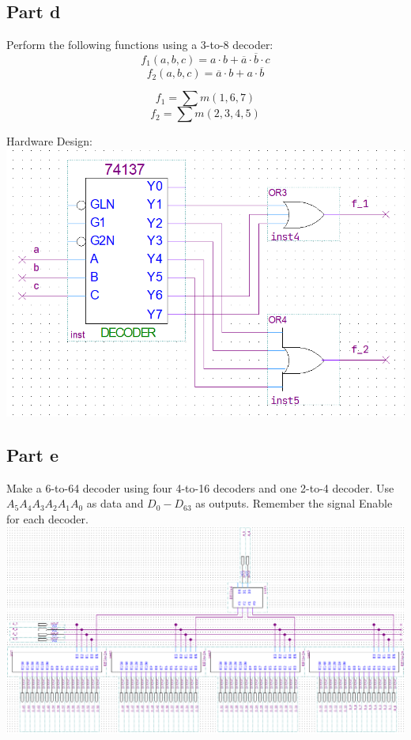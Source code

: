 \documentclass[12pt, a4paper]{article}
\begin{document}
	\subsection*{Part d}
	Perform the following functions using a 3-to-8 decoder:
	\begin{equation}
	f_1(a, b, c) = a \cdot b + \overline{a} \cdot \overline{b} \cdot {c}
	\end{equation}
	\begin{equation}
	f_2(a, b, c) = \overline{a} \cdot {b} + a \cdot \overline{b}
	\end{equation}
	
	$$f_1 = \sum{m(1, 6, 7)}$$
	$$f_2 = \sum{m(2, 3, 4, 5)}$$

	Hardware Design:\\
	\includegraphics[scale=0.6]{3d.png}

	\subsection*{Part e}
	Make a 6-to-64 decoder using four 4-to-16 decoders and one 2-to-4 decoder. Use $A_5A_4A_3A_2A_1A_0$ as data and $D_0 - D_{63}$ as outputs. Remember the signal Enable for each decoder.
	\\
	\includegraphics[scale=0.41]{3e.png}
\end{document}
